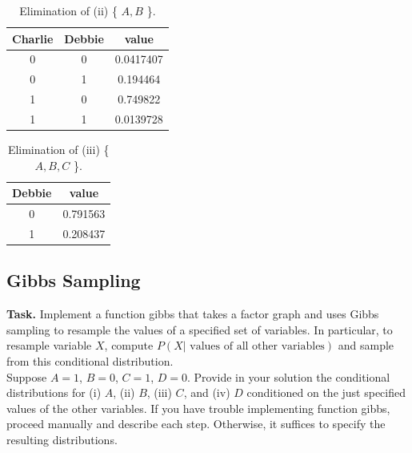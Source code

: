 \documentclass{support/acm_proc_article-sp}
\begin{document}
    \begin{table}[!htbp]
        \begin{center}
            \begin{tabular}{ c c | c }
                Charlie & Debbie & value \\
                \hline
                0 & 0 & 0.0417407 \\
                0 & 1 & 0.194464 \\
                1 & 0 & 0.749822 \\
                1 & 1 & 0.0139728 \\
            \end{tabular}
        \end{center}
        \caption{Elimination of (ii) \{ $A, B$ \}.}
        \label{table:elim-ab}
    \end{table}

    \begin{table}[!htbp]
        \begin{center}
            \begin{tabular}{ c | c }
                Debbie & value \\
                \hline
                0 & 0.791563 \\
                1 & 0.208437 \\
            \end{tabular}
        \end{center}
        \caption{Elimination of (iii) \{ $A, B, C$ \}.}
        \label{table:elim-abc}
    \end{table}


    \subsection{Gibbs Sampling}
    \label{sec:gibbs-sampling}

    \textbf{Task.} Implement a function gibbs that takes a factor graph and uses Gibbs sampling to resample the values
    of a specified set of variables.
    In particular, to resample variable $X$, compute $P(X | \mbox{ values of all other variables})$ and sample from this conditional
    distribution. \\
    Suppose $A=1$, $B=0$, $C=1$, $D=0$.
    Provide in your solution the conditional distributions for (i) $A$, (ii) $B$, (iii) $C$, and (iv) $D$ conditioned on the
    just specified values of the other variables.
    If you have trouble implementing function gibbs, proceed manually and describe each step.
    Otherwise, it suffices to specify the resulting distributions.
\end{document}
